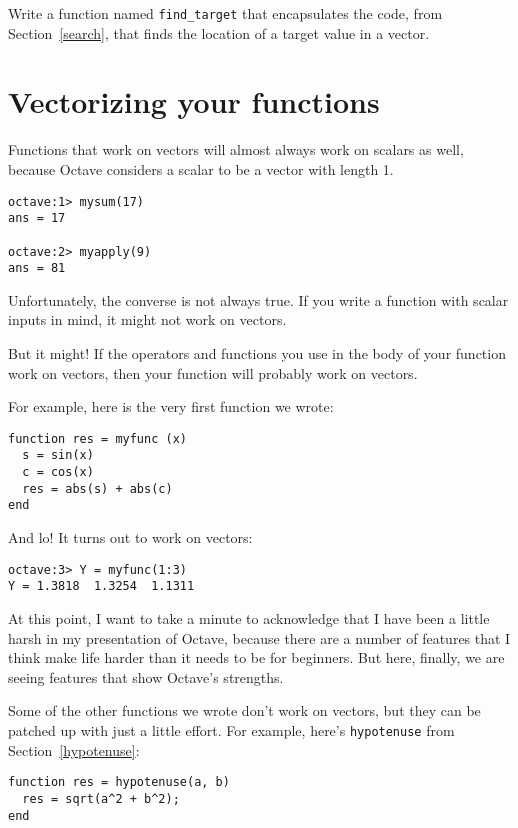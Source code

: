 \begin{ex}
Write a function named {\tt find\_target} that
encapsulates the code, from Section~\ref{search}, that finds the
location of a target value in a vector.
\end{ex}


\section{Vectorizing your functions}

Functions that work on vectors will almost always work on scalars
as well, because Octave considers a scalar to be a vector with
length 1.

\begin{verbatim}
octave:1> mysum(17)
ans = 17

octave:2> myapply(9)
ans = 81
\end{verbatim}

Unfortunately, the converse is not always true. If you write
a function with scalar inputs in mind, it might not work on vectors.

But it might! If the operators and functions
you use in the body of your function work on vectors, then your
function will probably work on vectors.

For example, here is the very first function we wrote:

\begin{verbatim}
function res = myfunc (x)
  s = sin(x)
  c = cos(x)
  res = abs(s) + abs(c)
end
\end{verbatim}

And lo! It turns out to work on vectors:

\begin{verbatim}
octave:3> Y = myfunc(1:3)
Y = 1.3818  1.3254  1.1311
\end{verbatim}

At this point, I want to take a minute to acknowledge that I
have been a little harsh in my presentation of Octave, because
there are a number of features that I think make life harder
than it needs to be for beginners. But here, finally,
we are seeing features that show Octave's strengths.

Some of the other functions we wrote don't work on vectors,
but they can be patched up with just a little effort. For example,
here's {\tt hypotenuse} from Section~\ref{hypotenuse}:

\begin{verbatim}
function res = hypotenuse(a, b)
  res = sqrt(a^2 + b^2);
end
\end{verbatim}

